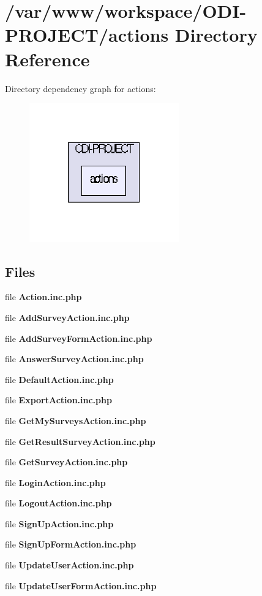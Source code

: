 \section{/var/www/workspace/\+O\+D\+I-\/\+P\+R\+O\+J\+E\+C\+T/actions Directory Reference}
\label{dir_7fb1c5d487265537d1fd3f0c61dc8501}
Directory dependency graph for actions\+:\nopagebreak
\begin{figure}[H]
\begin{center}
\leavevmode
\includegraphics[width=183pt]{dir_7fb1c5d487265537d1fd3f0c61dc8501_dep}
\end{center}
\end{figure}
\subsection*{Files}
\begin{DoxyCompactItemize}
\item 
file {\bfseries Action.\+inc.\+php}
\item 
file {\bfseries Add\+Survey\+Action.\+inc.\+php}
\item 
file {\bfseries Add\+Survey\+Form\+Action.\+inc.\+php}
\item 
file {\bfseries Answer\+Survey\+Action.\+inc.\+php}
\item 
file {\bfseries Default\+Action.\+inc.\+php}
\item 
file {\bfseries Export\+Action.\+inc.\+php}
\item 
file {\bfseries Get\+My\+Surveys\+Action.\+inc.\+php}
\item 
file {\bfseries Get\+Result\+Survey\+Action.\+inc.\+php}
\item 
file {\bfseries Get\+Survey\+Action.\+inc.\+php}
\item 
file {\bfseries Login\+Action.\+inc.\+php}
\item 
file {\bfseries Logout\+Action.\+inc.\+php}
\item 
file {\bfseries Sign\+Up\+Action.\+inc.\+php}
\item 
file {\bfseries Sign\+Up\+Form\+Action.\+inc.\+php}
\item 
file {\bfseries Update\+User\+Action.\+inc.\+php}
\item 
file {\bfseries Update\+User\+Form\+Action.\+inc.\+php}
\end{DoxyCompactItemize}
